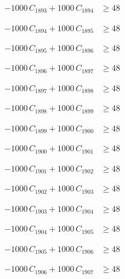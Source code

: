 \documentclass[a4paper,11pt]{article}
\begin{document}
\begin{align}
-1000\,C_{1893} + 1000\,C_{1894} &\geq 48 \nonumber
\end{align}

\begin{align}
-1000\,C_{1894} + 1000\,C_{1895} &\geq 48 \nonumber
\end{align}

\begin{align}
-1000\,C_{1895} + 1000\,C_{1896} &\geq 48 \nonumber
\end{align}

\begin{align}
-1000\,C_{1896} + 1000\,C_{1897} &\geq 48 \nonumber
\end{align}

\begin{align}
-1000\,C_{1897} + 1000\,C_{1898} &\geq 48 \nonumber
\end{align}

\begin{align}
-1000\,C_{1898} + 1000\,C_{1899} &\geq 48 \nonumber
\end{align}

\begin{align}
-1000\,C_{1899} + 1000\,C_{1900} &\geq 48 \nonumber
\end{align}

\begin{align}
-1000\,C_{1900} + 1000\,C_{1901} &\geq 48 \nonumber
\end{align}

\begin{align}
-1000\,C_{1901} + 1000\,C_{1902} &\geq 48 \nonumber
\end{align}

\begin{align}
-1000\,C_{1902} + 1000\,C_{1903} &\geq 48 \nonumber
\end{align}

\begin{align}
-1000\,C_{1903} + 1000\,C_{1904} &\geq 48 \nonumber
\end{align}

\begin{align}
-1000\,C_{1904} + 1000\,C_{1905} &\geq 48 \nonumber
\end{align}

\begin{align}
-1000\,C_{1905} + 1000\,C_{1906} &\geq 48 \nonumber
\end{align}

\begin{align}
-1000\,C_{1906} + 1000\,C_{1907} &\geq 48 \nonumber
\end{align}
\end{document}
